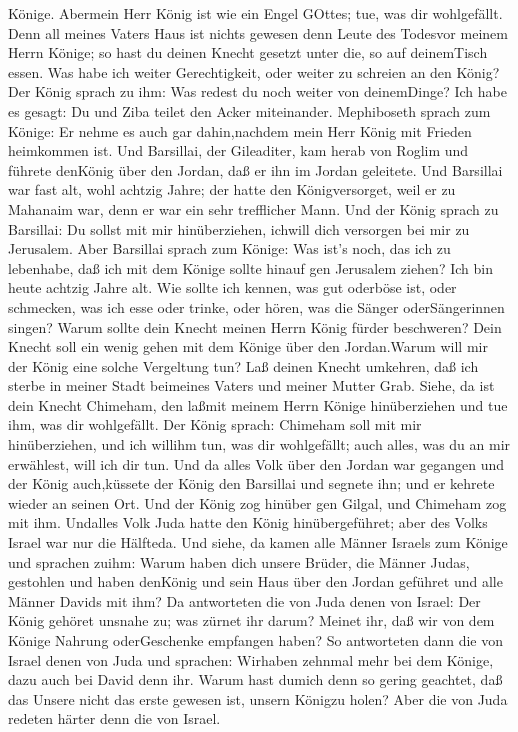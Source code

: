 Könige. Abermein Herr König ist wie ein Engel GOttes; tue, was dir
wohlgefällt.  Denn all meines Vaters Haus ist nichts
gewesen denn Leute des Todesvor meinem Herrn Könige; so hast du deinen
Knecht gesetzt unter die, so auf deinemTisch essen. Was habe ich weiter
Gerechtigkeit, oder weiter zu schreien an den König?  Der
König sprach zu ihm: Was redest du noch weiter von deinemDinge? Ich habe
es gesagt: Du und Ziba teilet den Acker miteinander. 
Mephiboseth sprach zum Könige: Er nehme es auch gar dahin,nachdem mein
Herr König mit Frieden heimkommen ist.  Und Barsillai, der
Gileaditer, kam herab von Roglim und führete denKönig über den Jordan,
daß er ihn im Jordan geleitete.  Und Barsillai war fast
alt, wohl achtzig Jahre; der hatte den Königversorget, weil er zu
Mahanaim war, denn er war ein sehr trefflicher Mann.  Und
der König sprach zu Barsillai: Du sollst mit mir hinüberziehen, ichwill
dich versorgen bei mir zu Jerusalem.  Aber Barsillai sprach
zum Könige: Was ist's noch, das ich zu lebenhabe, daß ich mit dem Könige
sollte hinauf gen Jerusalem ziehen?  Ich bin heute achtzig
Jahre alt. Wie sollte ich kennen, was gut oderböse ist, oder schmecken,
was ich esse oder trinke, oder hören, was die Sänger oderSängerinnen
singen? Warum sollte dein Knecht meinen Herrn König fürder beschweren?
 Dein Knecht soll ein wenig gehen mit dem Könige über den
Jordan.Warum will mir der König eine solche Vergeltung tun?
 Laß deinen Knecht umkehren, daß ich sterbe in meiner Stadt
beimeines Vaters und meiner Mutter Grab. Siehe, da ist dein Knecht
Chimeham, den laßmit meinem Herrn Könige hinüberziehen und tue ihm, was
dir wohlgefällt.  Der König sprach: Chimeham soll mit mir
hinüberziehen, und ich willihm tun, was dir wohlgefällt; auch alles, was
du an mir erwählest, will ich dir tun.  Und da alles Volk
über den Jordan war gegangen und der König auch,küssete der König den
Barsillai und segnete ihn; und er kehrete wieder an seinen Ort.
 Und der König zog hinüber gen Gilgal, und Chimeham zog mit
ihm. Undalles Volk Juda hatte den König hinübergeführet; aber des Volks
Israel war nur die Hälfteda.  Und siehe, da kamen alle
Männer Israels zum Könige und sprachen zuihm: Warum haben dich unsere
Brüder, die Männer Judas, gestohlen und haben denKönig und sein Haus
über den Jordan geführet und alle Männer Davids mit ihm? 
Da antworteten die von Juda denen von Israel: Der König gehöret unsnahe
zu; was zürnet ihr darum? Meinet ihr, daß wir von dem Könige Nahrung
oderGeschenke empfangen haben?  So antworteten dann die von
Israel denen von Juda und sprachen: Wirhaben zehnmal mehr bei dem
Könige, dazu auch bei David denn ihr. Warum hast dumich denn so gering
geachtet, daß das Unsere nicht das erste gewesen ist, unsern Königzu
holen? Aber die von Juda redeten härter denn die von Israel.

